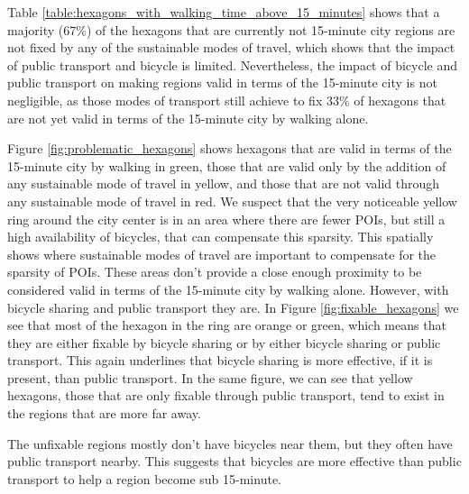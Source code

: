 Table \ref{table:hexagons_with_walking_time_above_15_minutes} shows that a majority (67\%) of the hexagons that are currently not 15-minute city regions are not fixed by any of the sustainable modes of travel, which shows that the impact of public transport and bicycle is limited.
Nevertheless, the impact of bicycle and public transport on making regions valid in terms of the 15-minute city is not negligible, as those modes of transport still achieve to fix 33\% of hexagons that are not yet valid in terms of the 15-minute city by walking alone.

Figure \ref{fig:problematic_hexagons} shows hexagons that are valid in terms of the 15-minute city by walking in green, those that are valid only by the addition of any sustainable mode of travel in yellow, and those that are not valid through any sustainable mode of travel in red.
We suspect that the very noticeable yellow ring around the city center is in an area where there are fewer POIs, but still a high availability of bicycles, that can compensate this sparsity.
This spatially shows where sustainable modes of travel are important to compensate for the sparsity of POIs.
These areas don't provide a close enough proximity to be considered valid in terms of the 15-minute city by walking alone.
However, with bicycle sharing and public transport they are.
In Figure \ref{fig:fixable_hexagons} we see that most of the hexagon in the ring are orange or green, which means that they are either fixable by bicycle sharing or by either bicycle sharing or public transport.
This again underlines that bicycle sharing is more effective, if it is present, than public transport.
In the same figure, we can see that yellow hexagons, those that are only fixable through public transport, tend to exist in the regions that are more far away.

The unfixable regions mostly don't have bicycles near them, but they often have public transport nearby.
This suggests that bicycles are more effective than public transport to help a region become sub 15-minute.

